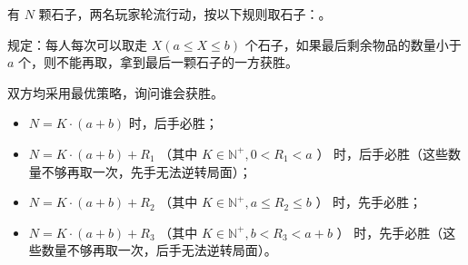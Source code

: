 有 $N$ 颗石子，两名玩家轮流行动，按以下规则取石子：。

规定：每人每次可以取走 $X(a \le X \le b)$ 个石子，如果最后剩余物品的数量小于 $a$ 个，则不能再取，拿到最后一颗石子的一方获胜。

双方均采用最优策略，询问谁会获胜。

\begin{itemize}
    \item $N = K\cdot(a+b)$ 时，后手必胜；
    \item $N = K\cdot(a+b)+R_1$ （其中 $K \in \mathbb{N}^+,0 < R_1 < a$ ） 时，后手必胜（这些数量不够再取一次，先手无法逆转局面）；
    \item $N = K\cdot(a+b)+R_2$ （其中 $K \in \mathbb{N}^+,a \le R_2 \le b$ ） 时，先手必胜；
    \item $N = K\cdot(a+b)+R_3$ （其中 $K \in \mathbb{N}^+,b < R_3 < a + b$ ） 时，先手必胜（这些数量不够再取一次，后手无法逆转局面）。
\end{itemize}